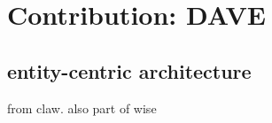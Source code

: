 \section{Contribution: DAVE}

\subsection{entity-centric architecture}
from claw. also part of wise
